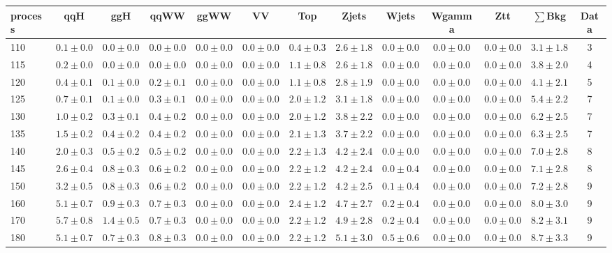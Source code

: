 \begin{table}
{\begin{center}
 \begin{tabular}{l | c c | c c c c c c c c  | c c}
 \hline
 process & qqH & ggH & qqWW & ggWW & VV & Top & Zjets & Wjets & Wgamma & Ztt & $\sum$Bkg & Data \\
\hline
110 & $0.1\pm0.0$ & $0.0\pm0.0$ & $0.0\pm0.0$ & $0.0\pm0.0$ & $0.0\pm0.0$ & $0.4\pm0.3$ & $2.6\pm1.8$ & $0.0\pm0.0$ & $0.0\pm0.0$ & $0.0\pm0.0$ & $3.1\pm1.8$ & 3 \\
115 & $0.2\pm0.0$ & $0.0\pm0.0$ & $0.0\pm0.0$ & $0.0\pm0.0$ & $0.0\pm0.0$ & $1.1\pm0.8$ & $2.6\pm1.8$ & $0.0\pm0.0$ & $0.0\pm0.0$ & $0.0\pm0.0$ & $3.8\pm2.0$ & 4 \\
120 & $0.4\pm0.1$ & $0.1\pm0.0$ & $0.2\pm0.1$ & $0.0\pm0.0$ & $0.0\pm0.0$ & $1.1\pm0.8$ & $2.8\pm1.9$ & $0.0\pm0.0$ & $0.0\pm0.0$ & $0.0\pm0.0$ & $4.1\pm2.1$ & 5 \\
125 & $0.7\pm0.1$ & $0.1\pm0.0$ & $0.3\pm0.1$ & $0.0\pm0.0$ & $0.0\pm0.0$ & $2.0\pm1.2$ & $3.1\pm1.8$ & $0.0\pm0.0$ & $0.0\pm0.0$ & $0.0\pm0.0$ & $5.4\pm2.2$ & 7 \\
130 & $1.0\pm0.2$ & $0.3\pm0.1$ & $0.4\pm0.2$ & $0.0\pm0.0$ & $0.0\pm0.0$ & $2.0\pm1.2$ & $3.8\pm2.2$ & $0.0\pm0.0$ & $0.0\pm0.0$ & $0.0\pm0.0$ & $6.2\pm2.5$ & 7 \\
135 & $1.5\pm0.2$ & $0.4\pm0.2$ & $0.4\pm0.2$ & $0.0\pm0.0$ & $0.0\pm0.0$ & $2.1\pm1.3$ & $3.7\pm2.2$ & $0.0\pm0.0$ & $0.0\pm0.0$ & $0.0\pm0.0$ & $6.3\pm2.5$ & 7 \\
140 & $2.0\pm0.3$ & $0.5\pm0.2$ & $0.5\pm0.2$ & $0.0\pm0.0$ & $0.0\pm0.0$ & $2.2\pm1.3$ & $4.2\pm2.4$ & $0.0\pm0.0$ & $0.0\pm0.0$ & $0.0\pm0.0$ & $7.0\pm2.8$ & 8 \\
145 & $2.6\pm0.4$ & $0.8\pm0.3$ & $0.6\pm0.2$ & $0.0\pm0.0$ & $0.0\pm0.0$ & $2.2\pm1.2$ & $4.2\pm2.4$ & $0.0\pm0.4$ & $0.0\pm0.0$ & $0.0\pm0.0$ & $7.1\pm2.8$ & 8 \\
150 & $3.2\pm0.5$ & $0.8\pm0.3$ & $0.6\pm0.2$ & $0.0\pm0.0$ & $0.0\pm0.0$ & $2.2\pm1.2$ & $4.2\pm2.5$ & $0.1\pm0.4$ & $0.0\pm0.0$ & $0.0\pm0.0$ & $7.2\pm2.8$ & 9 \\
160 & $5.1\pm0.7$ & $0.9\pm0.3$ & $0.7\pm0.3$ & $0.0\pm0.0$ & $0.0\pm0.0$ & $2.4\pm1.2$ & $4.7\pm2.7$ & $0.2\pm0.4$ & $0.0\pm0.0$ & $0.0\pm0.0$ & $8.0\pm3.0$ & 9 \\
170 & $5.7\pm0.8$ & $1.4\pm0.5$ & $0.7\pm0.3$ & $0.0\pm0.0$ & $0.0\pm0.0$ & $2.2\pm1.2$ & $4.9\pm2.8$ & $0.2\pm0.4$ & $0.0\pm0.0$ & $0.0\pm0.0$ & $8.2\pm3.1$ & 9 \\
180 & $5.1\pm0.7$ & $0.7\pm0.3$ & $0.8\pm0.3$ & $0.0\pm0.0$ & $0.0\pm0.0$ & $2.2\pm1.2$ & $5.1\pm3.0$ & $0.5\pm0.6$ & $0.0\pm0.0$ & $0.0\pm0.0$ & $8.7\pm3.3$ & 9 \\

\end{tabular}
\end{center}}
\end{table}

